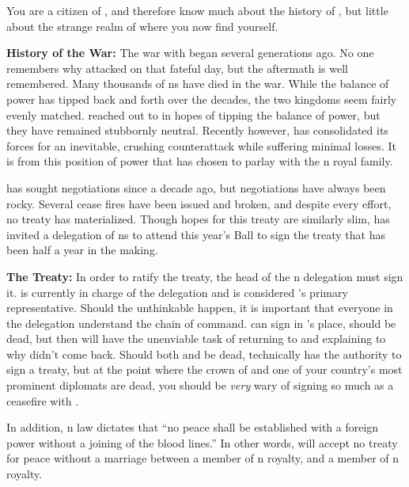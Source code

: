 \documentclass[blue]{NeptuneBall}
\begin{document}
\name{\bPacifican{}}

You are a citizen of \pPacifica{}, and therefore know much about the history of \pPacifica{}, but little about the strange realm of \pAtlantis{} where you now find yourself.

{\bf History of the War:}
The war with \pAtlantis{} began several generations ago. No one remembers why \pAtlantis{} attacked on that fateful day, but the aftermath is well remembered. Many thousands of \pPacifica{}ns have died in the war. While the balance of power has tipped back and forth over the decades, the two kingdoms seem fairly evenly matched. \pPacifica{} reached out to \pIndia{} in hopes of tipping the balance of power, but they have remained stubbornly neutral. Recently however, \pPacifica{} has consolidated its forces for an inevitable, crushing counterattack while suffering minimal losses. It is from this position of power that \cPacificanRuler{\King} \cPacificanRuler{} has chosen to parlay with the \pAtlantis{}n royal family.

\cKing{\King} \cKing{\MYname{}} has sought negotiations since a decade ago, but negotiations have always been rocky. Several cease fires have been issued and broken, and despite every effort, no treaty has materialized. Though hopes for this treaty are similarly slim, \cKing{\King} \cKing{} has invited a delegation of \pPacifica{}ns to attend this year's \cExExKing{} Ball to sign the treaty that has been half a year in the making.

{\bf The Treaty:}
In order to ratify the treaty, the head of the \pPacifica{}n delegation must sign it. \cPrince{} is currently in charge of the delegation and is considered \pPacifica{}'s primary representative. Should the unthinkable happen, it is important that everyone in the delegation understand the chain of command. \cDiplomat{} can sign in \cPrince{}'s place, should \cPrince{} be dead, but then \cDiplomat{} will have the unenviable task of returning to \pPacifica{} and explaining to \cPacificanRuler{\King} \cPacificanRuler{} why \cPacificanRuler{\their} \cPrince{\offspring} didn't come back. Should both \cPrince{} and \cDiplomat{} be dead, technically \cSpy{} has the authority to sign a treaty, but at the point where the crown \cPrince{\prince} of \pPacifica{} and one of your country's most prominent diplomats are dead, you should be \emph{very} wary of signing so much as a ceasefire with \pAtlantis{}.

In addition, \pPacifica{}n law dictates that ``no peace shall be established with a foreign power without a joining of the blood lines.'' In other words, \pPacifica{} will accept no treaty for peace without a marriage between a member of \pPacifica{}n royalty, and a member of \pAtlantis{}n royalty.
\end{document}
